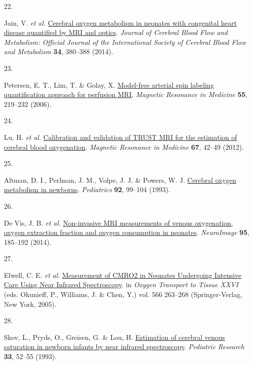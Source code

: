 \documentclass[
  letterpaper,
  DIV=11,
  numbers=noendperiod]{scrartcl}
\newlength{\cslhangindent}
\newlength{\csllabelwidth}
\newenvironment{CSLReferences}[2] %
 {\begin{list}{}{%
  \setlength{\itemindent}{0pt}
  \setlength{\leftmargin}{0pt}
  \setlength{\parsep}{0pt}
  \ifodd #1
   \setlength{\leftmargin}{\cslhangindent}
   \setlength{\itemindent}{-1\cslhangindent}
  \fi
  \setlength{\itemsep}{#2\baselineskip}}}
 {\end{list}}
\newcommand{\CSLLeftMargin}[1]{\parbox[t]{\csllabelwidth}{\strut#1\strut}}
\newcommand{\CSLRightInline}[1]{\parbox[t]{\linewidth - \csllabelwidth}{\strut#1\strut}}
\begin{document}
\begin{CSLReferences}{0}{0}
\CSLLeftMargin{22. }%
\CSLRightInline{Jain, V. \emph{et al.}
\href{https://doi.org/10.1038/jcbfm.2013.214}{Cerebral oxygen metabolism
in neonates with congenital heart disease quantified by {MRI} and
optics}. \emph{Journal of Cerebral Blood Flow and Metabolism: Official
Journal of the International Society of Cerebral Blood Flow and
Metabolism} \textbf{34}, 380--388 (2014).}

\CSLLeftMargin{23. }%
\CSLRightInline{Petersen, E. T., Lim, T. \& Golay, X.
\href{https://doi.org/10.1002/mrm.20784}{Model-free arterial spin
labeling quantification approach for perfusion {MRI}}. \emph{Magnetic
Resonance in Medicine} \textbf{55}, 219--232 (2006).}

\CSLLeftMargin{24. }%
\CSLRightInline{Lu, H. \emph{et al.}
\href{https://doi.org/10.1002/mrm.22970}{Calibration and validation of
{TRUST MRI} for the estimation of cerebral blood oxygenation}.
\emph{Magnetic Resonance in Medicine} \textbf{67}, 42--49 (2012).}

\CSLLeftMargin{25. }%
\CSLRightInline{Altman, D. I., Perlman, J. M., Volpe, J. J. \& Powers,
W. J. \href{https://www.ncbi.nlm.nih.gov/pubmed/8516092}{Cerebral oxygen
metabolism in newborns}. \emph{Pediatrics} \textbf{92}, 99--104 (1993).}

\CSLLeftMargin{26. }%
\CSLRightInline{De Vis, J. B. \emph{et al.}
\href{https://doi.org/10.1016/j.neuroimage.2014.03.060}{Non-invasive
{MRI} measurements of venous oxygenation, oxygen extraction fraction and
oxygen consumption in neonates}. \emph{NeuroImage} \textbf{95}, 185--192
(2014).}

\CSLLeftMargin{27. }%
\CSLRightInline{Elwell, C. E. \emph{et al.}
\href{https://doi.org/10.1007/0-387-26206-7_35}{Measurement of {CMRO2}
in {Neonates Undergoing Intensive Care Using Near Infrared
Spectroscopy}}. in \emph{Oxygen {Transport} to {Tissue XXVI}} (eds.
Okunieff, P., Williams, J. \& Chen, Y.) vol. 566 263--268
(Springer-Verlag, New York, 2005).}

\CSLLeftMargin{28. }%
\CSLRightInline{Skov, L., Pryds, O., Greisen, G. \& Lou, H.
\href{https://doi.org/10.1203/00006450-199301000-00011}{Estimation of
cerebral venous saturation in newborn infants by near infrared
spectroscopy}. \emph{Pediatric Research} \textbf{33}, 52--55 (1993).}


\end{CSLReferences}
\end{document}
